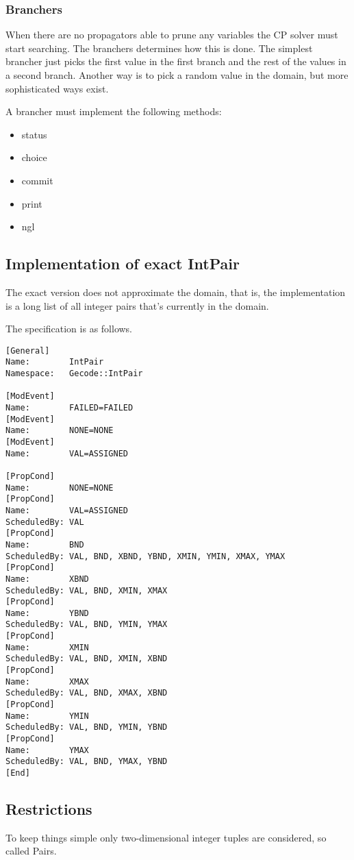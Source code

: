 \documentclass[a4paper,11pt]{article}
\begin{document}
\subsubsection{Branchers}
When there are no propagators able to prune any variables the CP solver must start searching. The branchers determines how this is done. The simplest brancher just picks the first value in the first branch and the rest of the values in a second branch. Another way is to pick a random value in the domain, but more sophisticated ways exist.

A brancher must implement the following methods:
\begin{itemize}
\item{status}
\item{choice}
\item{commit}
\item{print}
\item{ngl}
\end{itemize}

\subsection{Implementation of exact IntPair}
The exact version does not approximate the domain, that is, the implementation is a long list of all integer pairs that's currently in the domain.

The specification is as follows.
\begin{lstlisting}[frame=single]
[General]
Name:        IntPair
Namespace:   Gecode::IntPair

[ModEvent]
Name:        FAILED=FAILED
[ModEvent]
Name:        NONE=NONE
[ModEvent]
Name:        VAL=ASSIGNED

[PropCond]
Name:        NONE=NONE
[PropCond]
Name:        VAL=ASSIGNED
ScheduledBy: VAL
[PropCond]
Name:        BND
ScheduledBy: VAL, BND, XBND, YBND, XMIN, YMIN, XMAX, YMAX
[PropCond]
Name:        XBND
ScheduledBy: VAL, BND, XMIN, XMAX
[PropCond]
Name:        YBND
ScheduledBy: VAL, BND, YMIN, YMAX
[PropCond]
Name:        XMIN
ScheduledBy: VAL, BND, XMIN, XBND
[PropCond]
Name:        XMAX
ScheduledBy: VAL, BND, XMAX, XBND
[PropCond]
Name:        YMIN
ScheduledBy: VAL, BND, YMIN, YBND
[PropCond]
Name:        YMAX
ScheduledBy: VAL, BND, YMAX, YBND
[End]
\end{lstlisting}

\subsection{Restrictions}
To keep things simple only two-dimensional integer tuples are considered, so called Pairs.
\end{document}

